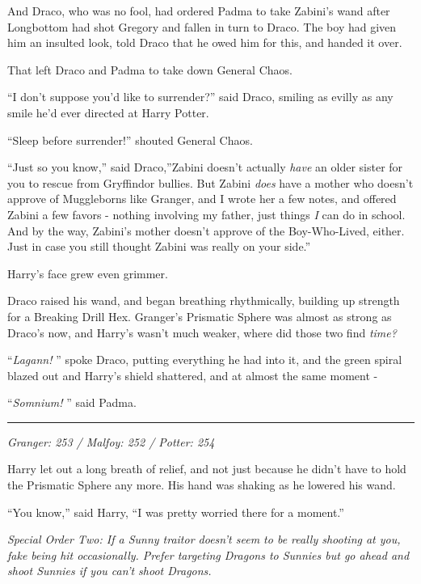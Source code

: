 And Draco, who was no fool, had ordered Padma to take Zabini's wand
after Longbottom had shot Gregory and fallen in turn to Draco. The boy
had given him an insulted look, told Draco that he owed him for this,
and handed it over.

That left Draco and Padma to take down General Chaos.

``I don't suppose you'd like to surrender?'' said Draco, smiling as
evilly as any smile he'd ever directed at Harry Potter.

``Sleep before surrender!'' shouted General Chaos.

``Just so you know,'' said Draco,''Zabini doesn't actually \emph{have}
an older sister for you to rescue from Gryffindor bullies. But Zabini
\emph{does} have a mother who doesn't approve of Muggleborns like
Granger, and I wrote her a few notes, and offered Zabini a few favors -
nothing involving my father, just things \emph{I} can do in school. And
by the way, Zabini's mother doesn't approve of the Boy-Who-Lived,
either. Just in case you still thought Zabini was really on your side.''

Harry's face grew even grimmer.

Draco raised his wand, and began breathing rhythmically, building up
strength for a Breaking Drill Hex. Granger's Prismatic Sphere was almost
as strong as Draco's now, and Harry's wasn't much weaker, where did
those two find \emph{time?}

``\emph{Lagann!} '' spoke Draco, putting everything he had into it, and
the green spiral blazed out and Harry's shield shattered, and at almost
the same moment -

``\emph{Somnium!} '' said Padma.

\begin{center}\rule{3in}{0.4pt}\end{center}

\emph{Granger: 253 / Malfoy: 252 / Potter: 254}

Harry let out a long breath of relief, and not just because he didn't
have to hold the Prismatic Sphere any more. His hand was shaking as he
lowered his wand.

``You know,'' said Harry, ``I was pretty worried there for a moment.''

\emph{Special Order Two: If a Sunny traitor doesn't seem to be really
shooting at you, fake being hit occasionally. Prefer targeting Dragons
to Sunnies but go ahead and shoot Sunnies if you can't shoot Dragons.}

